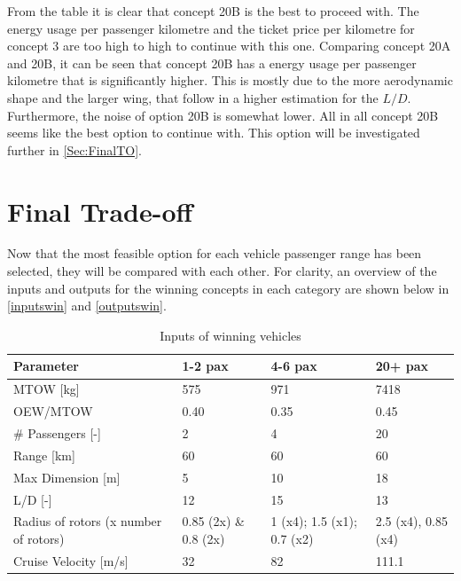 From the table it is clear that concept 20B is the best to proceed with. The energy usage per passenger kilometre and the ticket price per kilometre for concept 3 are too high to high to continue with this one. Comparing concept 20A and 20B, it can be seen that concept 20B has a energy usage per passenger kilometre that is significantly higher. This is mostly due to the more aerodynamic shape and the larger wing, that follow in a higher estimation for the $L/D$. Furthermore, the noise of option 20B is somewhat lower. All in all concept 20B seems like the best option to continue with. This option will be investigated further in \autoref{Sec:FinalTO}.  




\section{Final Trade-off}
\label{Sec:FinalTO}
Now that the most feasible option for each vehicle passenger range has been selected, they will be compared with each other. For clarity, an overview of the inputs and outputs for the winning concepts in each category are shown below in \autoref{inputswin} and \autoref{outputswin}. 

\begin{table}[H]
\captionsetup{justification=centering}
\caption{Inputs of winning vehicles}
\label{inputswin}
\begin{tabular}{llll}
\hline
\textbf{Parameter}                    & \textbf{1-2 pax}      & \textbf{4-6 pax} & \textbf{20+ pax}    \\ \hline
MTOW {[}kg{]}                         & 575                   &    971              & 7418                \\
OEW/MTOW        & 0.40                    &   0.35          & 0.45                  \\
\# Passengers {[}-{]}                 & 2                     &      4            & 20                  \\
Range {[}km{]}                        & 60                    &       60           & 60                  \\
Max Dimension {[}m{]}                 & 5                     &      10            & 18                  \\
L/D {[}-{]}                           & 12                    &       15           & 13                  \\
Radius of rotors (x number of rotors) & 0.85 (2x) \& 0.8 (2x) &    1 (x4); 1.5 (x1); 0.7 (x2)             & 2.5 (x4), 0.85 (x4) \\
Cruise Velocity {[}m/s{]}             & 32                    &        82          & 111.1               \\ \hline
\end{tabular}
\end{table}

